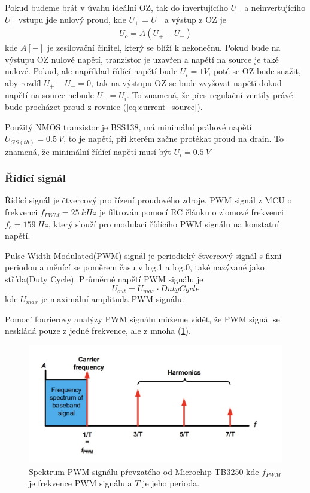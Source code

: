 Pokud budeme brát v úvahu ideální OZ, tak do invertujícího $U_-$ a neinvertujícího $U_+$ vstupu jde nulový proud, kde $U_+ = U_-$ a výstup z OZ je
\begin{align}
    U_o = A(U_+ - U_-)
\end{align}
kde $A [-] $ je zesilovační činitel, který se blíží k nekonečnu. Pokud bude na výstupu OZ nulové napětí, tranzistor je uzavřen a napětí na source je také nulové. Pokud, ale například řídící napětí bude  $U_i = 1V$, poté se OZ bude snažit, aby rozdíl $U_+ - U_- = 0$, tak na výstupu OZ se bude zvyšovat napětí dokud napětí na source nebude $U_- = U_i$. To znamená, že přes regulační ventily právě bude procházet proud z rovnice (\ref{eq:current_source}).

Použitý NMOS tranzistor je BSS138, má minimální práhové napětí $U_{GS(th)} = 0.5 \ V$, to je napětí, při kterém začne protékat proud na drain. To znamená, že minimální řídící napětí musí být $U_{i} = 0.5 \ V$


\subsubsection{Řídící signál}
Řídící signál je čtvercový pro řízení proudového zdroje. PWM signál z MCU o frekvenci $f_{PWM} = 25 \ kHz$ je filtrován pomocí RC článku o zlomové frekvenci $f_c = 159 \ Hz$, který slouží pro modulaci řídícího PWM signálu na konstatní napětí.
\par
Pulse Width Modulated(PWM) signál je periodický čtvercový signál s fixní periodou a měnící se poměrem času v log.1 a log.0, také nazývané jako střída(Duty Cycle). Průměrné napětí PWM signálu je
\begin{equation}
    U_{out} = U_{max} \cdot Duty Cycle
\end{equation}
kde $U_{max}$ je maximální amplituda PWM signálu. \par


Pomocí fourierovy analýzy PWM signálu můžeme vidět, že PWM signál se neskládá pouze z jedné frekvence, ale z mnoha (\ref{fig:pwm_spectrum}).

\begin{figure}[H]
    \centering
    \includegraphics[width=1\linewidth]{pictures/pwm_spectrum_microchip90003250A.jpg}
    \caption{Spektrum PWM signálu převzatého od Microchip TB3250 kde $f_{PWM}$ je frekvence PWM signálu a $T$ je jeho perioda. \cite{cite:MCPPWV}}
    \label{fig:pwm_spectrum}
\end{figure}

